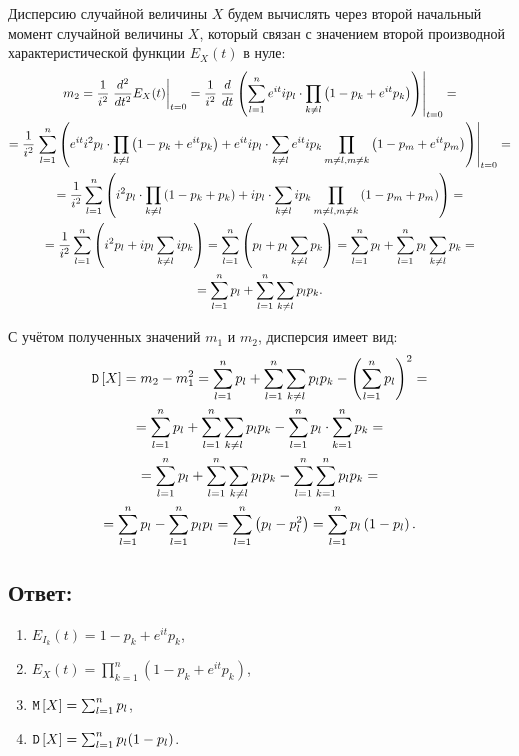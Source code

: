 Дисперсию случайной величины $X$ будем вычислять через второй начальный момент случайной величины $X$, который связан с значением второй производной характеристической функции
$E_X(t)$ в нуле:
\begin{multline}
    m_2
    = \frac{1}{i^2} \left . \frac{d^{2}}{d{t}^{2}} E_X(t) \right |_{t=0}
    = \frac{1}{i^2} \left . \frac{d}{dt} \left ( \sum_{l=1}^n e^{it} i p_l \cdot \prod_{k \neq l} \left ( 1 - p_k + e^{it} p_k \right ) \right ) \right |_{t=0} = \\
    = \frac{1}{i^2}
    \left .
    \sum_{l=1}^n
    \left (
    e^{it} i^2 p_l \cdot \prod_{k \neq l} \left ( 1 - p_k + e^{it} p_k \right )
    + e^{it} i p_l \cdot \sum_{k \neq l} e^{it} i p_k \prod_{m \neq l, m \neq k} \left ( 1 - p_m + e^{it} p_m \right )
    \right )
    \right |_{t=0} = \\
    = \frac{1}{i^2}
    \sum_{l=1}^n
    \left (
    i^2 p_l \cdot \prod_{k \neq l} \left ( 1 - p_k + p_k \right )
    + i p_l \cdot \sum_{k \neq l} i p_k \prod_{m \neq l, m \neq k} \left ( 1 - p_m + p_m \right )
    \right ) = \\
    = \frac{1}{i^2} \sum_{l=1}^n \left ( i^2 p_l + i p_l \sum_{k \neq l} i p_k \right )
    = \sum_{l=1}^n \left ( p_l + p_l \sum_{k \neq l} p_k \right )
    = \sum_{l=1}^n p_l + \sum_{l=1}^n p_l \sum_{k \neq l} p_k = \\
    = \sum_{l=1}^n p_l + \sum_{l=1}^n \sum_{k \neq l} p_l p_k .
\end{multline}

С учётом полученных значений $m_1$ и $m_2$, дисперсия имеет вид:
\begin{multline}
    \mathtt{D} \left [ X \right ]
    = m_2 - m_1^2
    = \sum_{l=1}^n p_l + \sum_{l=1}^n \sum_{k \neq l} p_l p_k - \left ( \sum_{l=1}^n p_l \right )^2 = \\
    = \sum_{l=1}^n p_l + \sum_{l=1}^n \sum_{k \neq l} p_l p_k - \sum_{l=1}^n p_l \cdot \sum_{k=1}^n p_k = \\
    = \sum_{l=1}^n p_l + \sum_{l=1}^n \sum_{k \neq l} p_l p_k - \sum_{l=1}^n \sum_{k=1}^n p_l p_k = \\
    = \sum_{l=1}^n p_l - \sum_{l=1}^n p_l p_l
    = \sum_{l=1}^n \left ( p_l - p_l^2 \right )
    = \sum_{l=1}^n p_l \left ( 1 - p_l \right ).
\end{multline}

\subsection*{Ответ:}
\begin{enumerate}
    \item $E_{I_k}(t) = 1 - p_k + e^{it} p_k$,
    \item $E_X(t) = \prod_{k=1}^n \left ( 1 - p_k + e^{it} p_k \right )$,
    \item $\mathtt{M} \left [ X \right ] = \sum_{l=1}^n p_l$,
    \item $\mathtt{D} \left [ X \right ] = \sum_{l=1}^n p_l ( 1 - p_l )$.
\end{enumerate}

